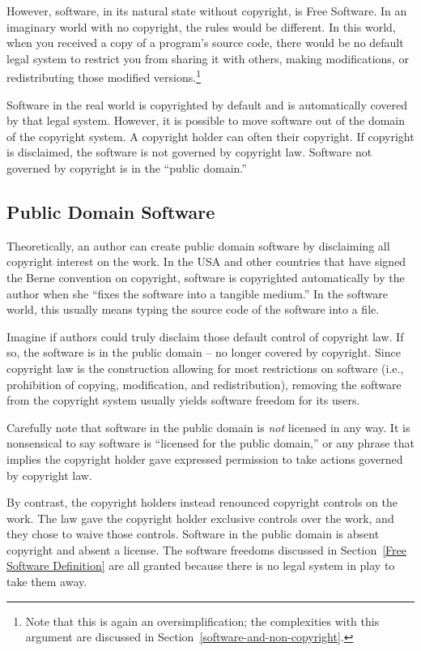 However, software, in its natural state without copyright, is Free
Software. In an imaginary world with no copyright, the rules would be
different. In this world, when you received a copy of a program's source
code, there would be no default legal system to restrict you from sharing it
with others, making modifications, or redistributing those modified
versions.\footnote{Note that this is again an oversimplification; the
  complexities with this argument are discussed in
  Section~\ref{software-and-non-copyright}.}

Software in the real world is copyrighted by default and is automatically
covered by that legal system.  However, it is possible to move software out
of the domain of the copyright system.  A copyright holder can often
 their copyright.  If copyright is disclaimed, the software is
not governed by copyright law.   Software not governed by copyright is in the
``public domain.''

\subsection{Public Domain Software}

Theoretically, an author can create public domain software by disclaiming all
copyright interest on the work. In the USA and other countries that have
signed the Berne convention on copyright, software is copyrighted
automatically by the author when she ``fixes the software into a tangible
medium.''  In the software world, this usually means typing the source code
of the software into a file.

Imagine if authors could truly disclaim those default control of copyright
law.  If so, the software is in the public domain -- no longer covered by
copyright.  Since copyright law is the construction allowing for most
restrictions on software (i.e., prohibition of copying, modification, and
redistribution), removing the software from the copyright system usually
yields software freedom for its users.

Carefully note that software in the public domain is \emph{not} licensed
in any way. It is nonsensical to say software is ``licensed for the
public domain,'' or any phrase that implies the copyright holder gave
expressed permission to take actions governed by copyright law.

By contrast, the copyright holders instead renounced copyright controls on
the work.  The law gave the copyright holder exclusive controls over the
work, and they chose to waive those controls.  Software in the public domain
is absent copyright and absent a license. The software freedoms discussed in
Section~\ref{Free Software Definition} are all granted because there is no
legal system in play to take them away.


